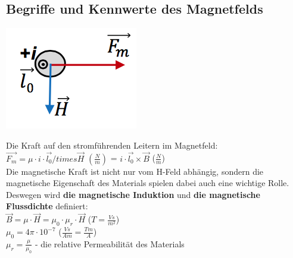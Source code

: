 \subsection{Begriffe und Kennwerte des Magnetfelds}
\begin{minipage}{0.2 \linewidth}
    \includegraphics[width =\linewidth]{./Pics/VL1/magKraft2}
\end{minipage}
\begin{minipage}{0.8 \linewidth}
Die Kraft auf den stromführenden Leitern im Magnetfeld:\\

$\vec{F_m} = \mu \cdot i \cdot \vec{l_0} /times \vec{H}$  $(\frac{N}{m})$ = $ i \cdot \vec{l_0} \times \vec{B}$  ($\frac{N}{m}$) \\

Die magnetische Kraft ist nicht nur vom H-Feld abhängig, sondern die magnetische Eigenschaft des Materials spielen dabei auch eine wichtige Rolle. Deswegen wird \textbf{die magnetische Induktion} und \textbf{die magnetische Flussdichte} definiert:\\

$ \vec{B} = \mu \cdot \vec{H} = \mu_0 \cdot \mu_r \cdot \vec{H}$  ($T = \frac{Vs}{m^2}$) \\

$\mu_0 = 4 \pi \cdot 10^{-7}$  ($\frac{Vs}{Am} = \frac{Tm}{A}$) \\

$\mu_r = \frac{\mu}{\mu_0}$ - die relative Permeabilität des Materials \\
\end{minipage}

